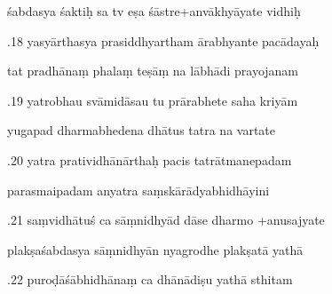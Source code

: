\documentclass[article,12pt,a4paper]{memoir}%
\newcounter{parCount}
\begin{document}
	  
	  \pstart \leavevmode%
	śabdasya śaktiḥ sa tv eṣa śāstre+anvākhyāyate vidhiḥ 
	{}
	\pend%
      

	  
	  \pstart {}.18 yasyārthasya prasiddhyartham ārabhyante pacādayaḥ 
	{}
	\pend%
      

	  
	  \pstart \leavevmode%
	tat pradhānaṃ phalaṃ teṣāṃ na lābhādi prayojanam 
	{}
	\pend%
      

	  
	  \pstart {}.19 yatrobhau svāmidāsau tu prārabhete saha kriyām 
	{}
	\pend%
      

	  
	  \pstart \leavevmode%
	yugapad dharmabhedena dhātus tatra na vartate 
	{}
	\pend%
      

	  
	  \pstart {}.20 yatra pratividhānārthaḥ pacis tatrātmanepadam 
	{}
	\pend%
      

	  
	  \pstart \leavevmode%
	parasmaipadam anyatra saṃskārādyabhidhāyini 
	{}
	\pend%
      

	  
	  \pstart {}.21 saṃvidhātuś ca sāṃnidhyād dāse dharmo +anusajyate 
	{}
	\pend%
      

	  
	  \pstart \leavevmode%
	plakṣaśabdasya sāṃnidhyān nyagrodhe plakṣatā yathā 
	{}
	\pend%
      

	  
	  \pstart {}.22 puroḍāśābhidhānaṃ ca dhānādiṣu yathā sthitam 
	{}
	\pend%
      
\end{document}
